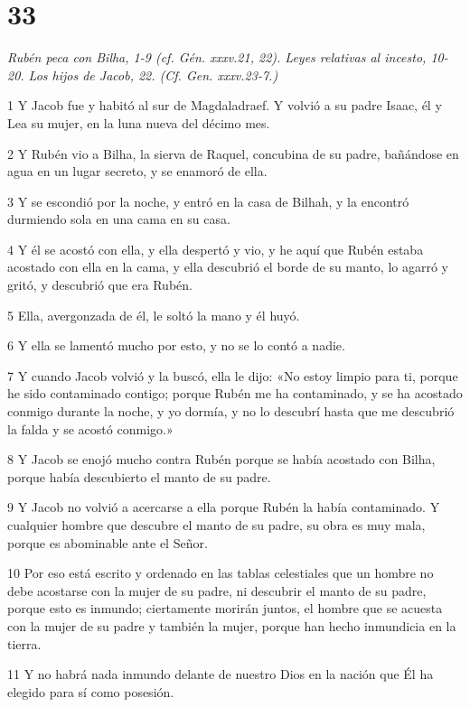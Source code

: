 \chapter{33}

\par \textit{Rubén peca con Bilha, 1-9 (cf. Gén. xxxv.21, 22). Leyes relativas al incesto, 10-20. Los hijos de Jacob, 22. (Cf. Gen. xxxv.23-7.)}

\par 1 Y Jacob fue y habitó al sur de Magdaladraef. Y volvió a su padre Isaac, él y Lea su mujer, en la luna nueva del décimo mes.
\par 2 Y Rubén vio a Bilha, la sierva de Raquel, concubina de su padre, bañándose en agua en un lugar secreto, y se enamoró de ella.
\par 3 Y se escondió por la noche, y entró en la casa de Bilhah, y la encontró durmiendo sola en una cama en su casa.
\par 4 Y él se acostó con ella, y ella despertó y vio, y he aquí que Rubén estaba acostado con ella en la cama, y ​​ella descubrió el borde de su manto, lo agarró y gritó, y descubrió que era Rubén.
\par 5 Ella, avergonzada de él, le soltó la mano y él huyó.
\par 6 Y ella se lamentó mucho por esto, y no se lo contó a nadie.
\par 7 Y cuando Jacob volvió y la buscó, ella le dijo: «No estoy limpio para ti, porque he sido contaminado contigo; porque Rubén me ha contaminado, y se ha acostado conmigo durante la noche, y yo dormía, y no lo descubrí hasta que me descubrió la falda y se acostó conmigo.»
\par 8 Y Jacob se enojó mucho contra Rubén porque se había acostado con Bilha, porque había descubierto el manto de su padre.
\par 9 Y Jacob no volvió a acercarse a ella porque Rubén la había contaminado. Y cualquier hombre que descubre el manto de su padre, su obra es muy mala, porque es abominable ante el Señor.
\par 10 Por eso está escrito y ordenado en las tablas celestiales que un hombre no debe acostarse con la mujer de su padre, ni descubrir el manto de su padre, porque esto es inmundo; ciertamente morirán juntos, el hombre que se acuesta con la mujer de su padre y también la mujer, porque han hecho inmundicia en la tierra.
\par 11 Y no habrá nada inmundo delante de nuestro Dios en la nación que Él ha elegido para sí como posesión.

